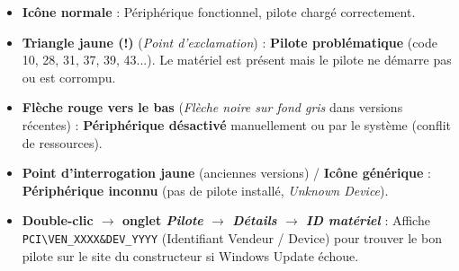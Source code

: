 \documentclass[11pt]{article}
\begin{document}
\begin{propriete}
\begin{itemize}
    \item \textbf{Icône normale} : Périphérique fonctionnel, pilote chargé correctement.
    \item \textbf{Triangle jaune (!)} (\emph{Point d'exclamation}) : \textbf{Pilote problématique} (code 10, 28, 31, 37, 39, 43...). Le matériel est présent mais le pilote ne démarre pas ou est corrompu.
    \item \textbf{Flèche rouge vers le bas} (\emph{Flèche noire sur fond gris} dans versions récentes) : \textbf{Périphérique désactivé} manuellement ou par le système (conflit de ressources).
    \item \textbf{Point d'interrogation jaune} (anciennes versions) / \textbf{Icône générique} : \textbf{Périphérique inconnu} (pas de pilote installé, \emph{Unknown Device}).
    \item \textbf{Double-clic $\rightarrow$ onglet \emph{Pilote} $\rightarrow$ \emph{Détails} $\rightarrow$ \emph{ID matériel}} : Affiche \texttt{PCI\textbackslash VEN\_XXXX\&DEV\_YYYY} (Identifiant Vendeur / Device) pour trouver le bon pilote sur le site du constructeur si Windows Update échoue.
\end{itemize}
\end{propriete}
\end{document}
